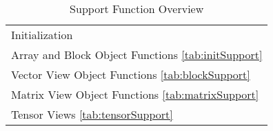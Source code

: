 \begin{table}[H]
\caption{Support Function Overview}
\label{tab:vsiplAPISupport}
\begin{center}
\begin{tabular}{l}
Initialization\\
Array and Block Object Functions \ref{tab:initSupport}\\
Vector View Object Functions \ref{tab:blockSupport}\\
Matrix View Object Functions \ref{tab:matrixSupport}\\
Tensor Views \ref{tab:tensorSupport}\\
\end{tabular}
\end{center}
\label{default}
\end{table}%